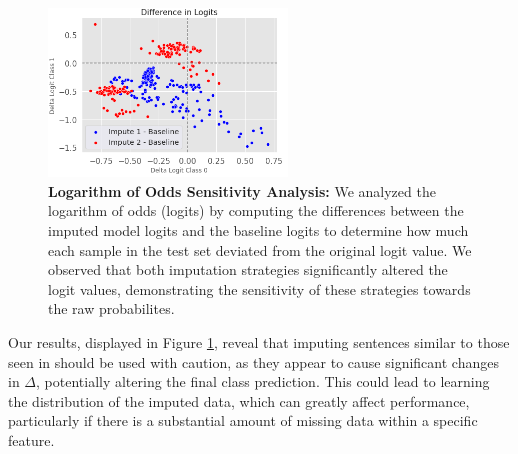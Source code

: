 \documentclass{article}
\theoremstyle{plain}
\theoremstyle{definition}
\theoremstyle{remark}
\begin{document}
\begin{figure}[h!]
    \centering
    \includegraphics[width=2.5in]{logit.png}
    \caption{\textbf{Logarithm of Odds Sensitivity Analysis:} We analyzed the logarithm of odds (logits) by computing the differences between the imputed model logits and the baseline logits to determine how much each sample in the test set deviated from the original logit value. We observed that both imputation strategies significantly altered the logit values, demonstrating the sensitivity of these strategies towards the raw probabilites.}
    \label{delta}
    \vspace{-0.4cm}
\end{figure}

Our results, displayed in Figure \ref{delta}, reveal that imputing sentences similar to those seen in \cite{lee2024multimodal} should be used with caution, as they appear to cause significant changes in $\Delta$, potentially altering the final class prediction. This could lead to learning the distribution of the imputed data, which can greatly affect performance, particularly if there is a substantial amount of missing data within a specific feature.
\end{document}
